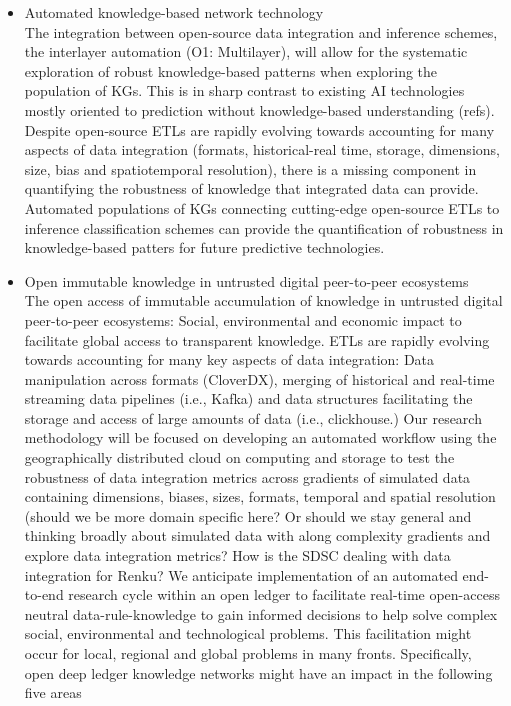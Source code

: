 \documentclass[12pt, a4paper]{article} %
\begin{document}
\begin{itemize}
\item Automated knowledge-based network technology\\
  
  The integration between open-source data integration and inference
  schemes, the interlayer automation (O1: Multilayer), will allow for
  the systematic exploration of robust knowledge-based patterns when
  exploring the population of KGs. This is in sharp contrast to
  existing AI technologies mostly oriented to prediction without
  knowledge-based understanding (refs). Despite open-source ETLs are
  rapidly evolving towards accounting for many aspects of data
  integration (formats, historical-real time, storage, dimensions,
  size, bias and spatiotemporal resolution), there is a missing
  component in quantifying the robustness of knowledge that integrated
  data can provide. Automated populations of KGs connecting
  cutting-edge open-source ETLs to inference classification schemes
  can provide the quantification of robustness in knowledge-based
  patters for future predictive technologies.

\item Open immutable knowledge in untrusted digital peer-to-peer ecosystems\\
  
  The open access of immutable accumulation of knowledge in untrusted
  digital peer-to-peer ecosystems: Social, environmental and economic
  impact to facilitate global access to transparent knowledge.  ETLs
  are rapidly evolving towards accounting for many key aspects of data
  integration: Data manipulation across formats (CloverDX), merging of
  historical and real-time streaming data pipelines (i.e., Kafka) and
  data structures facilitating the storage and access of large amounts
  of data (i.e., clickhouse.) Our research methodology will be focused
  on developing an automated workflow using the geographically
  distributed cloud on computing and storage to test the robustness of
  data integration metrics across gradients of simulated data
  containing dimensions, biases, sizes, formats, temporal and spatial
  resolution (should we be more domain specific here? Or should we
  stay general and thinking broadly about simulated data with along
  complexity gradients and explore data integration metrics? How is
  the SDSC dealing with data integration for Renku?  We anticipate
  implementation of an automated end-to-end research cycle within an
  open ledger to facilitate real-time open-access neutral
  data-rule-knowledge to gain informed decisions to help solve complex
  social, environmental and technological problems. This facilitation
  might occur for local, regional and global problems in many
  fronts. Specifically, open deep ledger knowledge networks might have
  an impact in the following five areas
  

\end{itemize}
\end{document}
